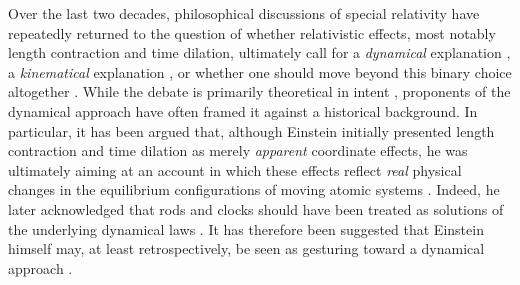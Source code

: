 \documentclass[submitted,12pt]{article} %
\begin{document}

\intro

Over the last two decades, philosophical discussions of special relativity have repeatedly returned to the question of whether relativistic effects, most notably length contraction and time dilation, ultimately call for a \emph{dynamical} explanation , a \emph{kinematical} explanation , or whether one should move beyond this binary choice altogether \citep{Acuna2016}. While the debate is primarily theoretical in intent , proponents of the dynamical approach have often framed it against a historical background. In particular, it has been argued that, although Einstein initially presented length contraction and time dilation as merely \emph{apparent} coordinate effects, he was ultimately aiming at an account in which these effects reflect \emph{real} physical changes in the equilibrium configurations of moving atomic systems \citep{Brown2022}. Indeed, he later acknowledged that rods and clocks should have been treated as solutions of the underlying dynamical laws \citep[61]{Einstein1949}. It has therefore been suggested that Einstein himself may, at least retrospectively, be seen as gesturing toward a dynamical approach \citep[70]{Brown2022}. 


\end{document}
